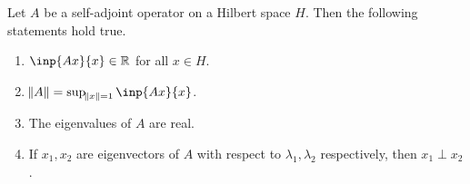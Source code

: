 \begin{prop}
\label{prop:hilbert_spaces:adjoint_operator:basic_facts}
Let $A$ be a self-adjoint operator on a Hilbert space $H$. 
Then the following statements hold true. 
\begin{enumerate}
    \item \label{prop:hilbert_spaces:adjoint_operator:basic_facts:1}
    $\inp{Ax}{x} \in \bR$ for all $x \in H$. 
    \item \label{prop:hilbert_spaces:adjoint_operator:basic_facts:2}
    $\norm{A} = \sup_{\norm{x} = 1} \inp{Ax}{x}$. 
    \item \label{prop:hilbert_spaces:adjoint_operator:basic_facts:3}
    The eigenvalues of $A$ are real. 
    \item \label{prop:hilbert_spaces:adjoint_operator:basic_facts:4}
    If $x_1, x_2$ are eigenvectors of $A$ with respect to $\lambda_1, 
    \lambda_2$ respectively, then $x_1 \perp x_2$. 
\end{enumerate}
\end{prop}
